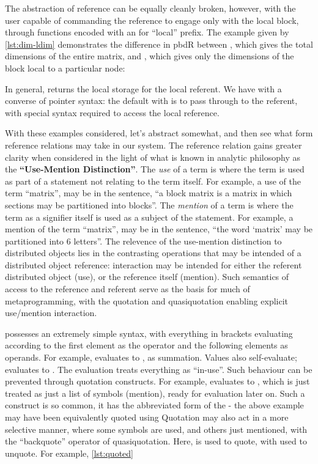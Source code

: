 The abstraction of reference can be equally cleanly broken, however,
with the user capable of commanding the reference to engage only with
the local block, through functions encoded with an  for
``local'' prefix. The example given by \cref{lst:dim-ldim} demonstrates the difference in
pbdR between , which gives the total dimensions of the
entire matrix, and , which gives only the dimensions of the
block local to a particular node:


In general,  returns the local storage for the
 local referent. We have with  a converse of
pointer syntax: the default with  is to pass through to the
referent, with special syntax required to access the local reference.

With these examples considered, let's abstract somewhat, and then see
what form reference relations may take in our system. The reference
relation gains greater clarity when considered in the light of what is
known in analytic philosophy as the \textbf{``Use-Mention
    Distinction''}. The \emph{use} of a term is where the term is used as
part of a statement not relating to the term itself. For example, a use
of the term ``matrix'', may be in the sentence, ``a block matrix is a
matrix in which sections may be partitioned into blocks''. The
\emph{mention} of a term is where the term as a signifier itself is used
as a subject of the statement. For example, a mention of the term
``matrix'', may be in the sentence, ``the word `matrix' may be
partitioned into 6 letters''. The relevence of the use-mention
distinction to distributed objects lies in the contrasting operations
that may be intended of a distributed object reference: interaction may
be intended for either the referent distributed object (use), or the
reference itself (mention). Such semantics of access to the reference
and referent serve as the basis for much of metaprogramming, with the
 quotation and quasiquotation enabling explicit use/mention
interaction.

 possesses an extremely simple syntax, with everything in brackets
evaluating according to the first element as the operator and the
following elements as operands. For example, 
evaluates to , as summation. Values also self-evaluate;
 evaluates to . The evaluation treats everything as
``in-use''. Such behaviour can be prevented through quotation
constructs. For example,  evaluates to
, which is just treated as just a list of symbols
(mention), ready for evaluation later on. Such a construct is so common,
it has the abbreviated form of the  - the
above example may have been equivalently quoted using
 Quotation may also act in a
more selective manner, where some symbols are used, and others just
mentioned, with the ``backquote'' operator of quasiquotation. Here,
 is used to quote, with  used to
unquote. For example, \cref{lst:quoted}

